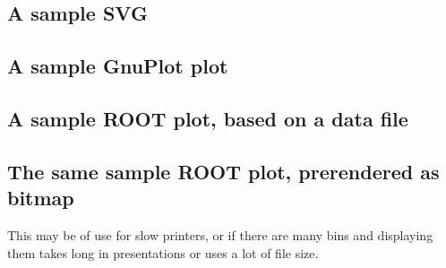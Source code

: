 \documentclass{article}
\begin{document}
\subsection*{A sample SVG}

\subsection*{A sample GnuPlot plot}

\subsection*{A sample ROOT plot, based on a data file}

\subsection*{The same sample ROOT plot, prerendered as bitmap}
This may be of use for slow printers, or if there are many bins and displaying them takes long
in presentations or uses a lot of file size.\\
\end{document}
